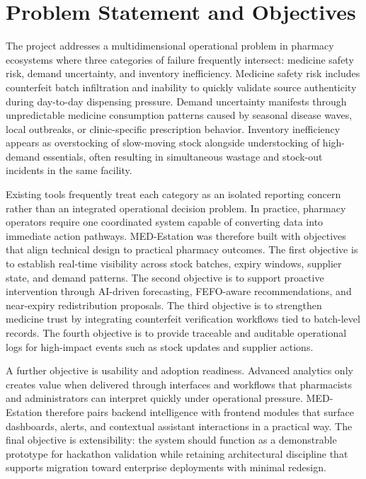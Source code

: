 \documentclass[12pt,a4paper]{report}
\begin{document}
\chapter{Problem Statement and Objectives}
The project addresses a multidimensional operational problem in pharmacy ecosystems where three categories of failure frequently intersect: medicine safety risk, demand uncertainty, and inventory inefficiency. Medicine safety risk includes counterfeit batch infiltration and inability to quickly validate source authenticity during day-to-day dispensing pressure. Demand uncertainty manifests through unpredictable medicine consumption patterns caused by seasonal disease waves, local outbreaks, or clinic-specific prescription behavior. Inventory inefficiency appears as overstocking of slow-moving stock alongside understocking of high-demand essentials, often resulting in simultaneous wastage and stock-out incidents in the same facility.

Existing tools frequently treat each category as an isolated reporting concern rather than an integrated operational decision problem. In practice, pharmacy operators require one coordinated system capable of converting data into immediate action pathways. MED-Estation was therefore built with objectives that align technical design to practical pharmacy outcomes. The first objective is to establish real-time visibility across stock batches, expiry windows, supplier state, and demand patterns. The second objective is to support proactive intervention through AI-driven forecasting, FEFO-aware recommendations, and near-expiry redistribution proposals. The third objective is to strengthen medicine trust by integrating counterfeit verification workflows tied to batch-level records. The fourth objective is to provide traceable and auditable operational logs for high-impact events such as stock updates and supplier actions.

A further objective is usability and adoption readiness. Advanced analytics only creates value when delivered through interfaces and workflows that pharmacists and administrators can interpret quickly under operational pressure. MED-Estation therefore pairs backend intelligence with frontend modules that surface dashboards, alerts, and contextual assistant interactions in a practical way. The final objective is extensibility: the system should function as a demonstrable prototype for hackathon validation while retaining architectural discipline that supports migration toward enterprise deployments with minimal redesign.
\end{document}
